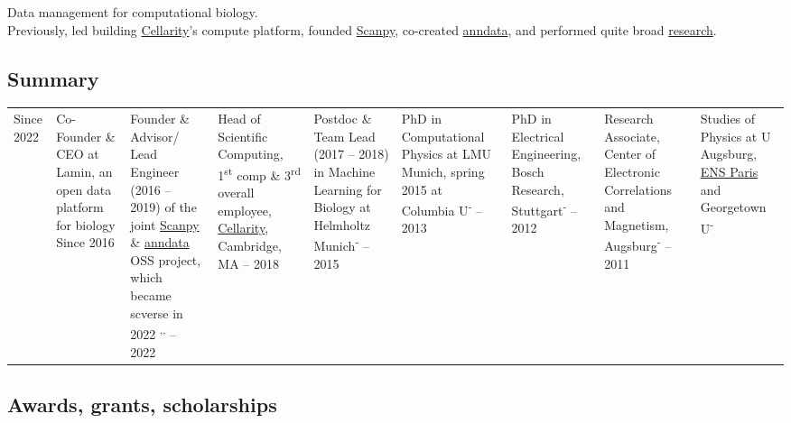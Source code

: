 Data management for computational biology.\\[-.8em]

\noindent Previously, led building \href{https://cellarity.com}{Cellarity}'s compute platform,
founded \href{https://scanpy.org}{Scanpy},
co-created \href{https://anndata.readthedocs.io}{anndata},
and performed quite broad \href{https://falexwolf.com/research/}{research}.

\subsection*{Summary}\vspace{-1em}
\begin{longtable}[t]{R{\widthC} p{\widthA}}
Since 2022 & Co-Founder \& CEO at Lamin, an open data platform for biology
\newline
Since 2016 & Founder \& Advisor/ Lead Engineer (2016 -- 2019) of the joint \href{https://scanpy.org}{Scanpy} \& \href{https://anndata.readthedocs.io/}{anndata} OSS project, which became scverse in 2022 \textsuperscript{,}\textsuperscript{,}
 -- 2022 & Head of Scientific Computing, 1\textsuperscript{st} comp \& 3\textsuperscript{rd} overall employee, \href{https://cellarity.com}{Cellarity}, Cambridge, MA
 -- 2018 & Postdoc \& Team Lead (2017 -- 2018) in Machine Learning for Biology at Helmholtz Munich\textsuperscript{-} -- 2015 & PhD in Computational Physics at LMU Munich, spring 2015 at Columbia U\textsuperscript{-} -- 2013 & PhD in Electrical Engineering, Bosch Research, Stuttgart\textsuperscript{-} -- 2012 & Research Associate, Center of Electronic Correlations and Magnetism, Augsburg\textsuperscript{-} -- 2011 & Studies of Physics at U Augsburg, \href{http://dx.doi.org/10.1038/nature.2016.20757}{ENS Paris} and Georgetown U\textsuperscript{-}
\end{longtable}

\subsection*{Awards, grants, scholarships}


